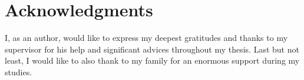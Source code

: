 \section*{Acknowledgments}
I, as an author, would like to express my deepest gratitudes and thanks to my supervisor \Supervisor for his help and significant advices throughout my thesis. Last but not least, I would like to also thank to my family for an enormous support during my studies.

\vfill